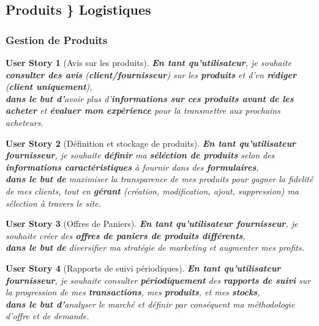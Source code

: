 \documentclass[a4paper,12pt]{report}
\theoremstyle{break}
\newtheorem*{userStory}{User Story}
\theoremstyle{break}
\theoremstyle{break}
\theoremstyle{break}
\theoremstyle{definition}
\theoremstyle{remark}
\begin{document}
\subsection{Produits \} Logistiques}
\subsubsection{Gestion de Produits}
\begin{userStory}[Avis sur les produits]
\textbf{En tant qu'utilisateur}, je souhaite \textbf{consulter des avis} (\textbf{{\color{green}client}/{\color{red}fournisseur}}) sur les \textbf{produits} et d'en \textbf{rédiger} (\textbf{{\color{green}client} uniquement}),\\
\indent
\textbf{dans le but d'}avoir plus d'\textbf{informations sur ces produits avant de les acheter} et \textbf{évaluer mon expérience} pour la transmettre aux prochains acheteurs.
\end{userStory}

\begin{userStory}[Définition et stockage de produits]
\textbf{En tant qu'utilisateur {\color{red}fournisseur}}, je souhaite \textbf{définir} ma \textbf{séléction de produits} selon des \textbf{informations caractéristiques} à fournir dans des \textbf{formulaires},\\
\indent
\textbf{dans le but de} maximiser la transparence de mes produits pour gagner la fidelité de mes clients, tout en \textbf{gérant} (création, modification, ajout, suppression) ma sélection à travers le site.
\end{userStory}

\begin{userStory}[Offres de Paniers]
\textbf{En tant qu'utilisateur {\color{red}fournisseur}}, je souhaite créer des \textbf{offres de paniers de produits différents},\\
\indent
\textbf{dans le but de} diversifier ma stratégie de marketing et augmenter mes profits.
\end{userStory}

\begin{userStory}[Rapports de suivi périodiques]
\textbf{En tant qu'utilisateur {\color{red}fournisseur}}, je souhaite consulter \textbf{périodiquement} des \textbf{rapports de suivi} sur la progression de mes \textbf{transactions}, mes \textbf{produits}, et mes \textbf{stocks},\\
\indent
\textbf{dans le but d'}analyser le marché et définir par conséquent ma méthodologie d'offre et de demande.
\end{userStory}
\end{document}
